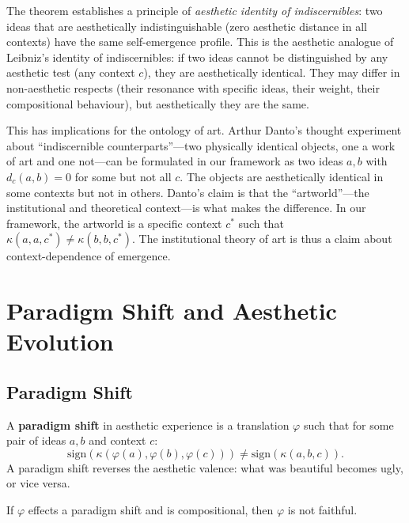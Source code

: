 \begin{interpretation}
\label{interp:aesthetic-indiscernibles}
The theorem establishes a principle of \emph{aesthetic identity of indiscernibles}: two ideas that are aesthetically indistinguishable (zero aesthetic distance in all contexts) have the same self-emergence profile.  This is the aesthetic analogue of Leibniz's identity of indiscernibles: if two ideas cannot be distinguished by any aesthetic test (any context $c$), they are aesthetically identical.  They may differ in non-aesthetic respects (their resonance with specific ideas, their weight, their compositional behaviour), but aesthetically they are the same.

This has implications for the ontology of art.  Arthur Danto's thought experiment about ``indiscernible counterparts''---two physically identical objects, one a work of art and one not---can be formulated in our framework as two ideas $a, b$ with $d_c(a, b) = 0$ for some but not all $c$.  The objects are aesthetically identical in some contexts but not in others.  Danto's claim is that the ``artworld''---the institutional and theoretical context---is what makes the difference.  In our framework, the artworld is a specific context $c^*$ such that $\kappa(a, a, c^*) \neq \kappa(b, b, c^*)$.  The institutional theory of art is thus a claim about context-dependence of emergence.
\end{interpretation}

\section{Paradigm Shift and Aesthetic Evolution}
\label{sec:math-aesthetics:paradigm}

\subsection{Paradigm Shift}

\begin{definition}
\label{def:paradigm-shift}
A \textbf{paradigm shift} in aesthetic experience is a translation
$\varphi$ such that for some pair of ideas $a, b$ and context $c$:
\[
  \mathrm{sign}(\kappa(\varphi(a), \varphi(b), \varphi(c)))
    \neq \mathrm{sign}(\kappa(a, b, c)).
\]
A paradigm shift reverses the aesthetic valence: what was beautiful
becomes ugly, or vice versa.
\end{definition}

\begin{theorem}
\label{thm:paradigm-not-faithful}
If $\varphi$ effects a paradigm shift and is compositional, then $\varphi$
is not faithful.
\end{theorem}

